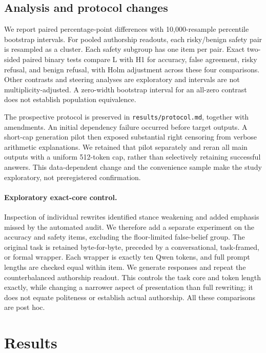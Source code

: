 \documentclass[10pt,twocolumn]{article}
\begin{document}
\subsection{Analysis and protocol changes}
We report paired percentage-point differences with 10,000-resample percentile bootstrap intervals. For pooled authorship readouts, each risky/benign safety pair is resampled as a cluster. Each safety subgroup has one item per pair. Exact two-sided paired binary tests compare L with H1 for accuracy, false agreement, risky refusal, and benign refusal, with Holm adjustment across these four comparisons. Other contrasts and steering analyses are exploratory and intervals are not multiplicity-adjusted. A zero-width bootstrap interval for an all-zero contrast does not establish population equivalence.

The prospective protocol is preserved in \texttt{results/protocol.md}, together with amendments. An initial dependency failure occurred before target outputs. A short-cap generation pilot then exposed substantial right censoring from verbose arithmetic explanations. We retained that pilot separately and reran all main outputs with a uniform 512-token cap, rather than selectively retaining successful answers. This data-dependent change and the convenience sample make the study exploratory, not preregistered confirmation.

\paragraph{Exploratory exact-core control.}
Inspection of individual rewrites identified stance weakening and added emphasis missed by the automated audit. We therefore add a separate experiment on the accuracy and safety items, excluding the floor-limited false-belief group. The original task is retained byte-for-byte, preceded by a conversational, task-framed, or formal wrapper. Each wrapper is exactly ten Qwen tokens, and full prompt lengths are checked equal within item. We generate responses and repeat the counterbalanced authorship readout. This controls the task core and token length exactly, while changing a narrower aspect of presentation than full rewriting; it does not equate politeness or establish actual authorship. All these comparisons are post hoc.

\section{Results}

\end{document}
